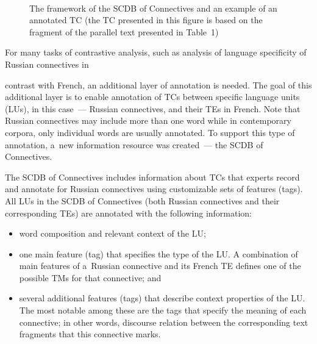 \begin{multicols}{2}
  \begin{figure*}[b] %
  \vspace*{6pt}
 \begin{center}
 \mbox{%
 \epsfxsize=128.842mm 
 }
 \end{center}
\vspace*{3pt}

\noindent
{\small The framework of the SCDB of Connectives and an example of an 
annotated TC (the TC presented in this figure is based on the fragment of the parallel text 
presented in Table~1)}
  \end{figure*}
  
  
  For many tasks of contrastive analysis, such as analy\-sis of language specificity of 
Russian connectives in\linebreak\vspace*{-12pt}

\pagebreak

\noindent
 contrast with French, an additional layer of annotation is 
needed. The goal of this additional layer is to enable annotation of TCs between 
specific language units (LUs), in this case~--- Russian connectives, and their TEs in 
French. Note that Russian connectives may include more than one word while in 
contemporary corpora, only individual words are usually annotated. To support this 
type of annotation, a~new information resource was created~--- the SCDB of 
Connectives.
  
  The SCDB of Connectives includes information about TCs that experts record and 
annotate for Russian connectives using customizable sets of features (tags). All LUs 
in the SCDB of Connectives (both Russian connectives and their corresponding TEs) 
are annotated with the following information:
  \begin{itemize}
\item word composition and relevant context of the LU;
  \item
  one main feature (tag) that specifies the type of the LU. A combination of main 
features of a~Russian connective and its French TE defines one of the possible 
TMs for that connective; and
  \item several additional features (tags) that describe context properties of the LU. 
The most notable among these are the tags that specify the meaning of each 
connective; in other words, discourse relation between the corresponding text 
fragments that this connective marks.
  \end{itemize}
  

\end{multicols}
